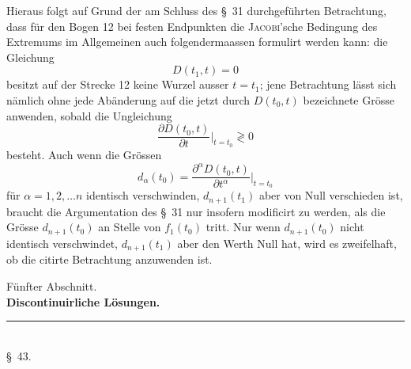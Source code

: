 \documentclass[11pt,a4paper,leqno]{article}
\begin{document}
Hieraus folgt auf Grund der am Schluss des \S~31 durchgeführten Betrachtung, dass für den Bogen 12 bei festen Endpunkten die \textsc{Jacobi}'sche Bedingung des Extremums im Allgemeinen auch folgendermaassen formulirt werden kann: die Gleichung
\[
D(t_1,t)=0
\]
besitzt auf der Strecke 12 keine Wurzel ausser $t=t_1$; jene Betrachtung lässt sich nämlich ohne jede Abänderung auf die jetzt durch $D(t_0,t)$ bezeichnete Grösse anwenden, sobald die Ungleichung
\[
\frac{\partial D(t_0,t)}{\partial t}\bigg|_{t=t_0}\gtrless 0
\]
besteht. Auch wenn die Grössen
\[
d_\alpha(t_0)=\frac{\partial^\alpha D(t_0,t)}{\partial t^\alpha}\bigg|_{t=t_0}
\]
für $\alpha=1,2,\ldots n$ identisch verschwinden, $d_{n+1}(t_1)$ aber von Null verschieden ist, braucht die Argumentation des \S~31 nur insofern modificirt zu werden, als die Grösse $d_{n+1}(t_0)$ an Stelle von $f_1(t_0)$ tritt. Nur wenn $d_{n+1}(t_0)$ nicht identisch verschwindet, $d_{n+1}(t_1)$ aber den Werth Null hat, wird es zweifelhaft, ob die citirte Betrachtung anzuwenden ist.



\begin{center}
{\large Fünfter Abschnitt.}\\[1.1ex]
{\Large\bfseries Discontinuirliche Lösungen.}\\[2ex]
\rule{32mm}{0.4pt}\\[2ex]
{\large \S~43.}
\end{center}
\end{document}
